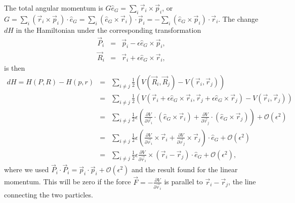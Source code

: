 \documentclass[letterpaper,11pt]{article}
\begin{document}
The total angular momentum is $G \hat{e}_G = \sum_i \vec{r}_i \times \vec{p}_i$, or $G = \sum_i (\vec{r}_i \times \vec{p}_i) \cdot \hat{e}_G = \sum_i (\hat{e}_G \times \vec{r}_i) \cdot \vec{p}_i  = - \sum_i (\hat{e}_G \times \vec{p}_i) \cdot \vec{r}_i$.  The change $dH$ in the Hamiltonian under the corresponding transformation
\begin{eqnarray*}
 \vec{P}_i & = & \vec{p}_i - \epsilon \hat{e}_G \times \vec{p}_i, \\
 \vec{R}_i & = & \vec{r}_i + \epsilon \hat{e}_G \times \vec{r}_i,
\end{eqnarray*}
is then
\begin{eqnarray*}
 dH = H(P,R) - H(p,r) & = & \sum_{i \neq j} \frac{1}{2} \left( V(\vec{R}_i,\vec{R}_j) - V(\vec{r}_i,\vec{r}_j) \right) \\
 & = & \sum_{i \neq j} \frac{1}{2} \left( V(\vec{r}_i + \epsilon \hat{e}_G \times \vec{r}_i,\vec{r}_j + \epsilon \hat{e}_G \times \vec{r}_j) - V(\vec{r}_i,\vec{r}_j) \right) \\
 & = & \sum_{i \neq j} \frac{1}{2} \epsilon \left( \frac{\partial V}{\partial \vec{r}_i} \cdot (\hat{e}_G \times \vec{r}_i) + \frac{\partial V}{\partial \vec{r}_j} \cdot (\hat{e}_G \times \vec{r}_j) \right) + \mathcal{O}(\epsilon^2) \\
 & = & \sum_{i \neq j} \frac{1}{2} \epsilon \left( \frac{\partial V}{\partial \vec{r}_i} \times \vec{r}_i + \frac{\partial V}{\partial \vec{r}_j} \times \vec{r}_j \right) \cdot \hat{e}_G + \mathcal{O}(\epsilon^2) \\
 & = & \sum_{i \neq j} \frac{1}{2} \epsilon \frac{\partial V}{\partial \vec{r}_i} \times (\vec{r}_i - \vec{r}_j) \cdot \hat{e}_G + \mathcal{O}(\epsilon^2),
\end{eqnarray*}
where we used $\vec{P}_i \cdot \vec{P}_i = \vec{p}_i \cdot \vec{p}_i + \mathcal{O}(\epsilon^2)$ and the result found for the linear momentum.  This will be zero if the force $\vec{F} = - \frac{\partial V}{\partial \vec{r}_i}$ is parallel to $\vec{r}_i - \vec{r}_j$, the line connecting the two particles.
\end{document}

